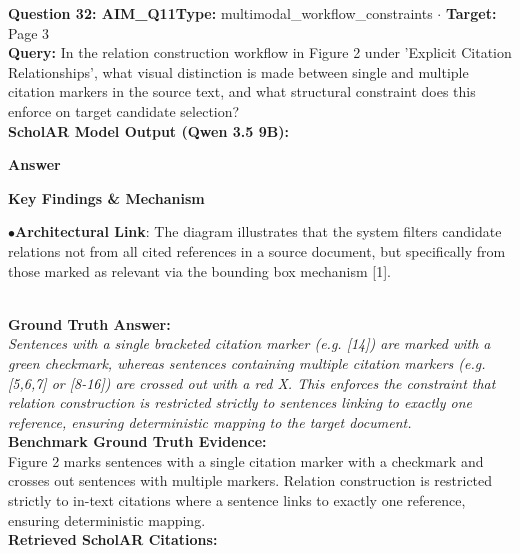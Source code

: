 \documentclass[10pt,a4paper]{article}
\begin{document}
\begin{tcolorbox}[questionbox]
{\noindent\bfseries\large\color{navy} Question 32: AIM\_Q11}\hfill {\footnotesize\color{darkteal}\textbf{Type:} multimodal\_workflow\_constraints $\cdot$ \textbf{Target:} Page 3}\\[4pt]
{\noindent\bfseries\color{accentblue} Query: } In the relation construction workflow in Figure 2 under 'Explicit Citation Relationships', what visual distinction is made between single and multiple citation markers in the source text, and what structural constraint does this enforce on target candidate selection?\\[6pt]
{\noindent\bfseries\color{navy} ScholAR Model Output (Qwen 3.5 9B):}\\[2pt]
{\small \noindent \textbf{Answer}\par\vspace{3pt}\noindent \textbf{Key Findings \& Mechanism}\par\vspace{3pt}\noindent\hspace*{8pt}$\bullet$\hspace*{4pt}\textbf{Architectural Link}: The diagram illustrates that the system filters candidate relations not from all cited references in a source document, but specifically from those marked as relevant via the bounding box mechanism [1].}\\[6pt]
{\noindent\bfseries\color{darkteal} Ground Truth Answer:}\\[2pt]
{\small\itshape Sentences with a single bracketed citation marker (e.g. [14]) are marked with a green checkmark, whereas sentences containing multiple citation markers (e.g. [5,6,7] or [8-16]) are crossed out with a red X. This enforces the constraint that relation construction is restricted strictly to sentences linking to exactly one reference, ensuring deterministic mapping to the target document.}\\[4pt]
{\noindent\bfseries\color{darkteal} Benchmark Ground Truth Evidence:}\\[2pt]
{\footnotesize Figure 2 marks sentences with a single citation marker with a checkmark and crosses out sentences with multiple markers. Relation construction is restricted strictly to in-text citations where a sentence links to exactly one reference, ensuring deterministic mapping.}\\[4pt]
{\noindent\bfseries\color{navy} Retrieved ScholAR Citations:}\\[2pt]
\begin{itemize}\setlength\itemsep{1pt}

\end{itemize}
\end{tcolorbox}
\end{document}
